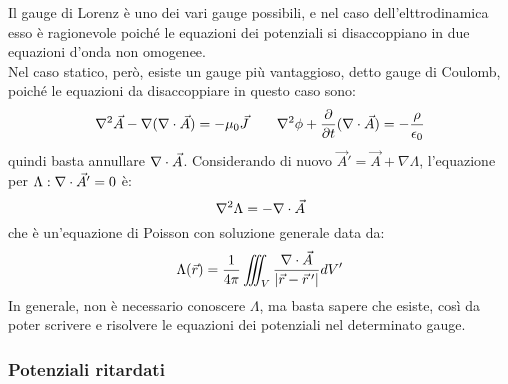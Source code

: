 Il gauge di Lorenz è uno dei vari gauge possibili, e nel caso dell'elttrodinamica esso è ragionevole poiché le equazioni dei potenziali si disaccoppiano in due equazioni d'onda non omogenee. \\ 
Nel caso statico, però, esiste un gauge più vantaggioso, detto gauge di Coulomb, poiché le equazioni da disaccoppiare in questo caso sono:
\begin{equation}
	\nabla^2\vec{A} - \nabla(\nabla\cdot\vec{A}) = -\mu_0 \vec{J} \qquad \nabla^2\phi + \frac{\partial}{\partial t} (\nabla\cdot\vec{A}) = -\frac{\rho}{\epsilon_0}
	\label{eq:81}
\end{equation}
quindi basta annullare $ \nabla\cdot\vec{A} $. Considerando di nuovo $ \vec{A}' = \vec{A} + \nabla\Lambda $, l'equazione per $ \Lambda : \nabla\cdot\vec{A}' = 0 $ è:
\begin{equation}
	\nabla^2 \Lambda = - \nabla\cdot\vec{A}
	\label{eq:82}
\end{equation}
che è un'equazione di Poisson con soluzione generale data da:
\begin{equation}
	\Lambda(\vec{r}) = \frac{1}{4\pi} \iiint_V \frac{\nabla\cdot\vec{A}}{\left\lvert\vec{r} - \vec{r}\,'\right\rvert} dV'
	\label{eq:83}
\end{equation}
In generale, non è necessario conoscere $ \Lambda $, ma basta sapere che esiste, così da poter scrivere e risolvere le equazioni dei potenziali nel determinato gauge.

\subsubsection{Potenziali ritardati}

